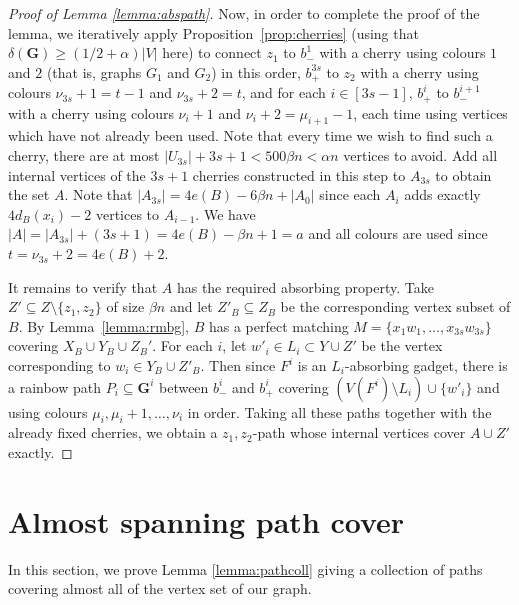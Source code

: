 \documentclass[11pt, dvipsnames]{amsart}
\theoremstyle{plain}
\theoremstyle{definition}
\newcommand{\mbf}[1]{\mathbf{#1}}
\newcommand{\sm}{\setminus}
\newcommand{\bB}{\beta}
\begin{document}
\begin{proof}[Proof of Lemma \ref{lemma:abspath}]
Now, in order to complete the proof of the lemma, we iteratively apply Proposition~\ref{prop:cherries} (using that $\delta(\mbf G)\geq (1/2+\alpha)|V|$ here) to connect $z_1$ to $b_-^1$ with a cherry using colours $1$ and $2$ (that is, graphs $G_1$ and $G_2$) in this order, $b_{+}^{3s}$ to $z_2$ with a cherry using colours $\nu_{3s}+1=t-1$ and $\nu_{3s}+2=t$, and for each $i \in [3s -1]$, $b_{+}^i$ to $b_-^{i+1}$ with a cherry using colours $\nu_i+1$ and $\nu_i+2=\mu_{i+1}-1$, each time using vertices which have not already been used. Note that every time we wish to find such a cherry, there are at most $|U_{3s}|+3s+1< 500\beta n <\alpha n$ vertices to avoid. Add all internal vertices of the $3s+1$ cherries constructed in this step to $A_{3s}$ to obtain the set $A$. Note that $|A_{3s}|=4e(B)-6\beta n+|A_0|$ since each $A_i$ adds exactly $4 d_B(x_i)-2$ vertices to $A_{i-1}$.
We have $
|A| = |A_{3s}|+ (3s+1) = 4e(B)-\bB n+1=a$
and all colours are used since $t=\nu_{3s}+2=4e(B)+2$.

It remains to verify that $A$ has the required absorbing property. Take $Z'\subseteq Z\sm \{z_1,z_2\}$ of size $\beta n$ and let $Z'_B\subseteq Z_B$ be the corresponding vertex subset of $B$. By Lemma~\ref{lemma:rmbg}, $B$ has a perfect matching $M=\{x_1w_1,\ldots,x_{3s}w_{3s}\}$ covering $X_B\cup Y_B\cup Z_B'$. For each $i$, let $w'_i\in L_i\subset Y\cup Z'$ be the vertex corresponding to $w_i\in Y_B\cup Z'_B$. Then since $F^i$ is an $L_i$-absorbing gadget, there is a rainbow path $P_i\subseteq \mbf G^i$ between $b_-^i$ and $b_{+}^i$ covering $(V(F^i)\sm L_i)\cup \{w'_i\}$ and using colours $\mu_i,\mu_i+1,\ldots,\nu_i$ in order. Taking all these paths together with the already fixed cherries, we obtain a $z_1,z_2$-path whose internal vertices cover $A\cup Z'$ exactly.  \end{proof}

\section{Almost spanning path cover} \label{sec:path cover}
In this section, we prove Lemma \ref{lemma:pathcoll} giving a collection of paths covering almost all of the vertex set of our graph. 
\end{document}
